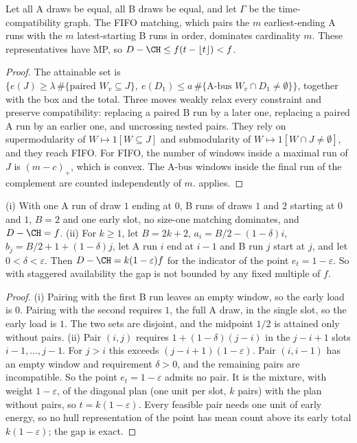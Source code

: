 \begin{theorem}\label{ext:thm6}
Let all A draws be equal, all B draws be equal, and let $\Gamma$ be the
time-compatibility graph. The FIFO matching, which pairs the $m$
earliest-ending A runs with the $m$ latest-starting B runs in order, dominates
cardinality $m$. These representatives have MP, so
$D-\CH\le f(t-\lfloor t\rfloor)<f$.
\end{theorem}
\begin{proof}
The attainable set is
$\{e(J)\ge\lambda\,\#\{\text{paired }W_v\subseteq J\},\ e(D_1)\le a\,\#\{\text{A-bus }W_v\cap D_1\ne\emptyset\}\}$,
together with the box and the total. Three moves weakly relax every
constraint and preserve compatibility: replacing a paired B run by a later
one, replacing a paired A run by an earlier one, and uncrossing nested pairs.
They rely on supermodularity of $W\mapsto1[W\subseteq J]$ and submodularity of
$W\mapsto1[W\cap J\ne\emptyset]$, and they reach FIFO. For FIFO, the number of
windows inside a maximal run of $J$ is $(m-c)_+$, which is convex. The A-bus
windows inside the final run of the complement are counted independently of
$m$.  applies.
\end{proof}

\begin{proposition}\label{ext:ex45}
(i) With one A run of draw $1$ ending at $0$, B runs of draws $1$ and $2$
starting at $0$ and $1$, $B=2$ and one early slot, no size-one matching
dominates, and $D-\CH=f$. (ii) For $k\ge1$, let $B=2k+2$,
$a_i=B/2-(1-\delta)i$, $b_j=B/2+1+(1-\delta)j$, let A run $i$ end at $i-1$
and B run $j$ start at $j$, and let $0<\delta<\varepsilon$. Then
$D-\CH=k(1-\varepsilon)f$ for the indicator of the point
$e_t=1-\varepsilon$. So with staggered availability the gap is not bounded by
any fixed multiple of $f$.
\end{proposition}
\begin{proof}
(i) Pairing with the first B run leaves an empty window, so the early load
is $0$. Pairing with the second requires $1$, the full A draw, in the single
slot, so the early load is $1$. The two sets are disjoint, and the midpoint
$1/2$ is attained only without pairs. (ii) Pair $(i,j)$ requires
$1+(1-\delta)(j-i)$ in the $j-i+1$ slots $i-1,\dots,j-1$. For $j>i$ this
exceeds $(j-i+1)(1-\varepsilon)$. Pair $(i,i-1)$ has an empty window and
requirement $\delta>0$, and the remaining pairs are incompatible. So the
point $e_t=1-\varepsilon$ admits no pair. It is the mixture, with weight
$1-\varepsilon$, of the diagonal plan (one unit per slot, $k$ pairs) with
the plan without pairs, so $t=k(1-\varepsilon)$. Every feasible pair
needs one unit of early energy, so no hull representation of the point has
mean count above its early total $k(1-\varepsilon)$; the gap is exact.
\end{proof}

